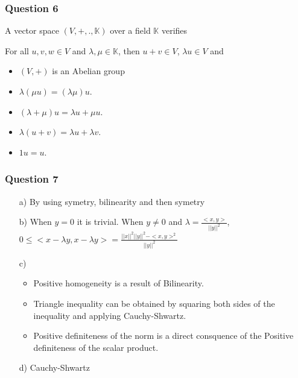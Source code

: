 \documentclass[12pt]{article}
\newcommand{\Q}[1]{\subsubsection*{Question #1}}
\begin{document}
\Q{6}
A vector space $(V,+,.,{\mathbb K})$ over a field $\mathbb K$ verifies

For all $u,v,w\in V$ and $\lambda, \mu \in \mathbb K$, then $u+v\in V$, $\lambda u\in V$ and

\begin{itemize}
\item $(V,+)$ is an Abelian group
\item $\lambda(\mu u)=(\lambda\mu)u$.
\item $(\lambda+\mu)u=\lambda u+\mu u$.
\item  $\lambda(u+v)=\lambda u+\lambda v$.
\item $1u=u$.
\end{itemize}

\Q{7}
\begin{itemize}
\item [a)] By using symetry, bilinearity and then symetry
\item [b)] When $y = 0$ it is trivial. When $y \neq 0$ and $\lambda = \frac{<x,y>}{||y||^2}$, $0 \leq <x - \lambda y, x - \lambda y> = \frac{||x||^2 ||y||^2 - <x, y>^2}{||y||^2} $

\item [c)]
  \begin{itemize}
  \item Positive homogeneity is a result of Bilinearity.
  \item Triangle inequality can be obtained by squaring both sides of the inequality and applying Cauchy-Shwartz.
  \item Positive definiteness of the norm is a direct consquence of the Positive definiteness of the scalar product.
  \end{itemize}
  
  \item [d)] Cauchy-Shwartz
  \end{itemize}
\end{document}
